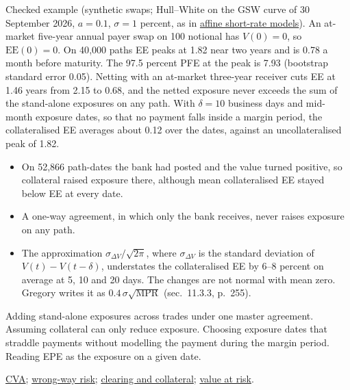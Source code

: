 \begin{qfdefinition}
 Checked example (synthetic swaps; Hull--White on the GSW curve of 30 September 2026, $a=0.1$, $\sigma=1$ percent, as in \hyperref[mod:affine-short-rate-models]{affine short-rate models}). An at-market five-year annual payer swap on 100 notional has $V(0)=0$, so $\mathrm{EE}(0)=0$. On 40{,}000 paths EE peaks at 1.82 near two years and is 0.78 a month before maturity. The 97.5 percent PFE at the peak is 7.93 (bootstrap standard error 0.05). Netting with an at-market three-year receiver cuts EE at 1.46 years from 2.15 to 0.68, and the netted exposure never exceeds the sum of the stand-alone exposures on any path. With $\delta=10$ business days and mid-month exposure dates, so that no payment falls inside a margin period, the collateralised EE averages about 0.12 over the dates, against an uncollateralised peak of 1.82.
\begin{itemize}
\item On 52{,}866 path-dates the bank had posted and the value turned positive, so collateral raised exposure there, although mean collateralised EE stayed below EE at every date.
\item A one-way agreement, in which only the bank receives, never raises exposure on any path.
\item The approximation $\sigma_{\Delta V}/\sqrt{2\pi}$, where $\sigma_{\Delta V}$ is the standard deviation of $V(t)-V(t-\delta)$, understates the collateralised EE by 6--8 percent on average at 5, 10 and 20 days. The changes are not normal with mean zero. Gregory writes it as $0.4\,\sigma\sqrt{\text{MPR}}$ (sec.~11.3.3, p.~255).
\end{itemize}

 Adding stand-alone exposures across trades under one master agreement. Assuming collateral can only reduce exposure. Choosing exposure dates that straddle payments without modelling the payment during the margin period. Reading EPE as the exposure on a given date.

 \hyperref[meth:credit-valuation-adjustment]{CVA}; \hyperref[def:wrong-way-risk]{wrong-way risk}; \hyperref[mech:otc-clearing-collateral]{clearing and collateral}; \hyperref[meth:portfolio-var-methods-decomposition]{value at risk}.

\end{qfdefinition}

